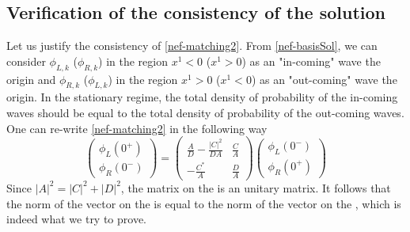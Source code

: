 \subsection{Verification of the consistency of the solution}
Let us justify the consistency of \cref{nef-matching2}. From \cref{nef-basisSol}, we can consider $\phi_{L,k}$ ($\phi_{R,k}$) in the region $x^1 < 0$ ($x^1 > 0 $) as an "in-coming" wave \wrt the origin and $\phi_{R,k}$ ($\phi_{L,k}$) in the region $x^1 > 0$ ($x^1 < 0 $) as an "out-coming" wave \wrt the origin. In the stationary regime, the total density of probability of the in-coming waves should be equal to the total density of probability of the out-coming waves. 
One can re-write \cref{nef-matching2} in the following way
\begin{equation}\label{nef-consistency}
\begin{pmatrix}
\phi_L(0^+) \\
\phi_R(0^-)
\end{pmatrix}=\begin{pmatrix}
\frac{A}{D} - \frac{| C |^2}{DA} & \frac{C}{A}  \\
-\frac{C^*}{A}  &  \frac{D}{A}
\end{pmatrix}\begin{pmatrix}
\phi_L(0^-) \\
\phi_R(0^+)
\end{pmatrix}
\end{equation} 
Since $|A|^2 = |C|^2 + |D|^2$, the matrix on the \rhs is an unitary matrix. It follows that the norm of the vector on the \lhs is equal to the norm of the vector on the \rhs, which is indeed what we try to prove.